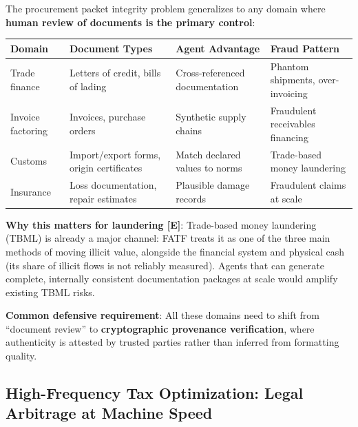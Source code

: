 \documentclass[11pt,letterpaper]{article}
\begin{document}
\begin{infobox}
The procurement packet integrity problem generalizes to any domain where \textbf{human review of documents is the primary control}:

\begin{center}
\small
\begin{tabular}{L{2.5cm}L{3.5cm}L{3cm}L{3.5cm}}
\toprule
\textbf{Domain} & \textbf{Document Types} & \textbf{Agent Advantage} & \textbf{Fraud Pattern} \\
\midrule
Trade finance & Letters of credit, bills of lading & Cross-referenced documentation & Phantom shipments, over-invoicing \\
Invoice factoring & Invoices, purchase orders & Synthetic supply chains & Fraudulent receivables financing \\
Customs & Import/export forms, origin certificates & Match declared values to norms & Trade-based money laundering \\
Insurance & Loss documentation, repair estimates & Plausible damage records & Fraudulent claims at scale \\
\bottomrule
\end{tabular}
\end{center}

\textbf{Why this matters for laundering [E]}: Trade-based money laundering (TBML) is already a major channel: FATF treats it as one of the three main methods of moving illicit value, alongside the financial system and physical cash (its share of illicit flows is not reliably measured). Agents that can generate complete, internally consistent documentation packages at scale would amplify existing TBML risks.

\textbf{Common defensive requirement}: All these domains need to shift from ``document review'' to \textbf{cryptographic provenance verification}, where authenticity is attested by trusted parties rather than inferred from formatting quality.
\end{infobox}

\subsection{High-Frequency Tax Optimization: Legal Arbitrage at Machine Speed}
\end{document}
